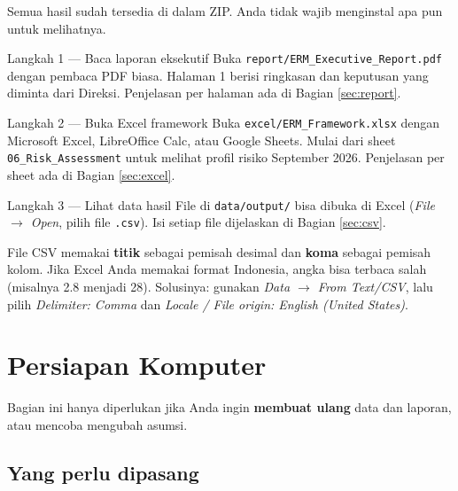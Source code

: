 \documentclass[11pt,a4paper]{article}
\newcommand{\file}[1]{\texttt{\small #1}}
\begin{document}
Semua hasil sudah tersedia di dalam ZIP. Anda tidak wajib menginstal apa pun untuk melihatnya.

\begin{stepbox}{Langkah 1 --- Baca laporan eksekutif}
Buka \file{report/ERM\_\allowbreak{}Executive\_\allowbreak{}Report.pdf} dengan pembaca PDF biasa. Halaman 1 berisi ringkasan dan keputusan yang diminta dari Direksi. Penjelasan per halaman ada di Bagian \ref{sec:report}.
\end{stepbox}

\begin{stepbox}{Langkah 2 --- Buka Excel framework}
Buka \file{excel/ERM\_\allowbreak{}Framework.xlsx} dengan Microsoft Excel, LibreOffice Calc, atau Google Sheets. Mulai dari sheet \file{06\_\allowbreak{}Risk\_\allowbreak{}Assessment} untuk melihat profil risiko September 2026. Penjelasan per sheet ada di Bagian \ref{sec:excel}.
\end{stepbox}

\begin{stepbox}{Langkah 3 --- Lihat data hasil}
File di \file{data/output/} bisa dibuka di Excel (\emph{File $\rightarrow$ Open}, pilih file \file{.csv}). Isi setiap file dijelaskan di Bagian \ref{sec:csv}.
\end{stepbox}

\begin{warnbox}
File CSV memakai \textbf{titik} sebagai pemisah desimal dan \textbf{koma} sebagai pemisah kolom. Jika Excel Anda memakai format Indonesia, angka bisa terbaca salah (misalnya 2.8 menjadi 28). Solusinya: gunakan \emph{Data $\rightarrow$ From Text/CSV}, lalu pilih \emph{Delimiter: Comma} dan \emph{Locale / File origin: English (United States)}.
\end{warnbox}
\section{Persiapan Komputer}\label{sec:persiapan}

Bagian ini hanya diperlukan jika Anda ingin \textbf{membuat ulang} data dan laporan, atau mencoba mengubah asumsi.

\subsection{Yang perlu dipasang}
\end{document}
